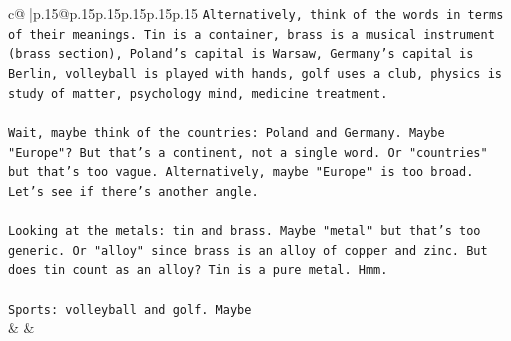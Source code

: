 \documentclass{article}
\begin{document}
{\begin{supertabular}{c@{$\;$}|p{.15\linewidth}@{}p{.15\linewidth}p{.15\linewidth}p{.15\linewidth}p{.15\linewidth}p{.15\linewidth}}
{{{\texttt{Alternatively, think of the words in terms of their meanings. Tin is a container, brass is a musical instrument (brass section), Poland's capital is Warsaw, Germany's capital is Berlin, volleyball is played with hands, golf uses a club, physics is study of matter, psychology mind, medicine treatment.} \\
\\ 
\texttt{Wait, maybe think of the countries: Poland and Germany. Maybe "Europe"? But that's a continent, not a single word. Or "countries" but that's too vague. Alternatively, maybe "Europe" is too broad. Let's see if there's another angle.} \\
\\ 
\texttt{Looking at the metals: tin and brass. Maybe "metal" but that's too generic. Or "alloy" since brass is an alloy of copper and zinc. But does tin count as an alloy? Tin is a pure metal. Hmm.} \\
\\ 
\texttt{Sports: volleyball and golf. Maybe} \\
            }
        }
    }
    & & \\ \\


\end{supertabular}}
\end{document}
